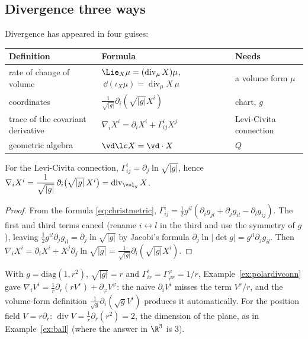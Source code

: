 \subsection{Divergence three ways}\label{sec:divthree}

Divergence has appeared in four guises:
\begin{center}
\small
\begin{tabular}{@{}p{4.1cm}p{5.4cm}p{4.6cm}@{}}
\toprule
\textbf{Definition} & \textbf{Formula} & \textbf{Needs}\\
\midrule
rate of change of volume & $\Lie_X\mu=(\operatorname{div}_\mu X)\mu$, $\ \dd(\iota_X\mu)=\operatorname{div}_\mu X\,\mu$ & a volume form $\mu$\\
coordinates & $\frac1{\sqrt{|g|}}\partial_i(\sqrt{|g|}X^i)$ & chart, $g$\\
trace of the covariant derivative & $\nabla_iX^i=\partial_iX^i+\Gamma^i_{ij}X^j$ & Levi-Civita connection\\
geometric algebra & $\vd\lc X=\vd\cdot X$ & $Q$\\
\bottomrule
\end{tabular}
\end{center}

\begin{proposition}\label{prop:divagree}
For the Levi-Civita connection, $\Gamma^i_{ij}=\partial_j\ln\sqrt{|g|}$, hence $\nabla_iX^i=\dfrac1{\sqrt{|g|}}\,\partial_i\bigl(\sqrt{|g|}\,X^i\bigr)=\operatorname{div}_{\vol_g}X$.
\end{proposition}
\begin{proof}
From the formula \eqref{eq:christmetric}, $\Gamma^i_{ij}=\frac12g^{il}(\partial_ig_{jl}+\partial_jg_{il}-\partial_lg_{ij})$. The first and third terms cancel (rename $i\leftrightarrow l$ in the third and use the symmetry of $g$), leaving $\frac12g^{il}\partial_jg_{il}=\partial_j\ln\sqrt{|g|}$ by Jacobi's formula $\partial_j\ln|\det g|=g^{il}\partial_jg_{il}$. Then $\nabla_iX^i=\partial_iX^i+X^j\partial_j\ln\sqrt{|g|}=\frac1{\sqrt{|g|}}\partial_i(\sqrt{|g|}X^i)$.
\end{proof}

\begin{example}\label{ex:polardiv}
With $g=\mathrm{diag}(1,r^2)$, $\sqrt{|g|}=r$ and $\Gamma^i_{ir}=\Gamma^\varphi_{\varphi r}=1/r$, Example~\ref{ex:polardivconn} gave $\nabla_iV^i=\frac1r\partial_r(rV^r)+\partial_\varphi V^\varphi$: the naive $\partial_iV^i$ misses the term $V^r/r$, and the volume-form definition $\frac1{\sqrt g}\partial_i(\sqrt gV^i)$ produces it automatically. For the position field $V=r\partial_r$: $\operatorname{div}V=\frac1r\partial_r(r^2)=2$, the dimension of the plane, as in Example~\ref{ex:ball} (where the answer in $\R^3$ is $3$).
\end{example}

